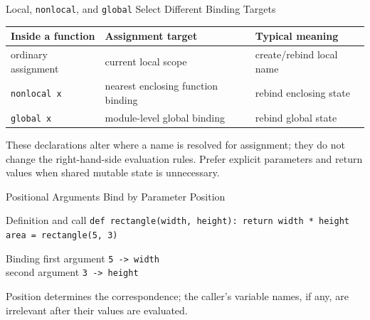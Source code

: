 \documentclass[aspectratio=169,10pt]{beamer}
\begin{document}
\begin{frame}{Local, \texttt{nonlocal}, and \texttt{global} Select Different Binding Targets}
  \begin{center}
    \renewcommand{\arraystretch}{1.35}
    \begin{tabular}{l|l|l}
      \textbf{Inside a function} & \textbf{Assignment target} & \textbf{Typical meaning} \\\hline
      ordinary assignment & current local scope & create/rebind local name \\
      \texttt{nonlocal x} & nearest enclosing function binding & rebind enclosing state \\
      \texttt{global x} & module-level global binding & rebind global state
    \end{tabular}
  \end{center}

  \begin{keyidea}
    These declarations alter where a name is resolved for assignment; they do not change the right-hand-side evaluation rules. Prefer explicit parameters and return values when shared mutable state is unnecessary.
  \end{keyidea}
\end{frame}


\begin{frame}{Positional Arguments Bind by Parameter Position}
  \begin{block}{Definition and call}
    \texttt{def rectangle(width, height):}\
    \hspace*{0.20in}\texttt{return width * height}\\[0.08in]
    \texttt{area = rectangle(5, 3)}
  \end{block}

  \begin{block}{Binding}
    first argument \texttt{5 -> width}\\
    second argument \texttt{3 -> height}
  \end{block}

  Position determines the correspondence; the caller's variable names, if any, are irrelevant after their values are evaluated.
\end{frame}
\end{document}
